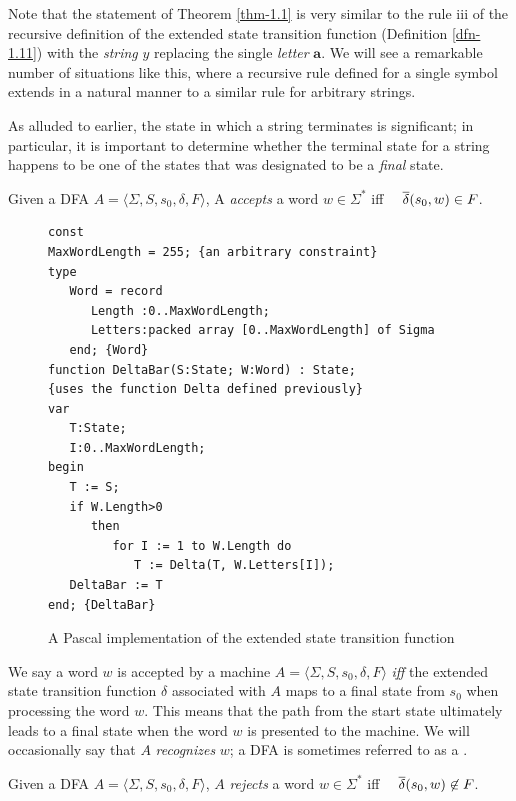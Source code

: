 Note that the statement of Theorem \ref{thm-1.1} is very similar to the rule iii
of the recursive definition of the extended state transition function
(Definition \ref{dfn-1.11}) with the \emph{string} $y$ replacing the single
\emph{letter} $\pmb{a}$. We will see a remarkable number of situations like this,
where a recursive rule defined for a single symbol extends in a natural manner
to a similar rule for arbitrary strings.

As alluded to earlier, the state in which a string terminates is significant; in
particular, it is important to determine whether the terminal state for a string
happens to be one of the states that was designated to be a \emph{final} state.

\begin{dfn}\label{dfn-1.12}
Given a DFA $A = \langle\Sigma,S,s_0,\delta,F\rangle$, A \emph{accepts} a word
$w \in \Sigma^*$ iff \ \  $\overline{\delta}(s_0,w) \in F$.
\end{dfn}

\begin{figure}
\begin{verbatim}
const
MaxWordLength = 255; {an arbitrary constraint} 
type 
   Word = record 
      Length :0..MaxWordLength; 
      Letters:packed array [0..MaxWordLength] of Sigma 
   end; {Word} 
function DeltaBar(S:State; W:Word) : State; 
{uses the function Delta defined previously} 
var 
   T:State; 
   I:0..MaxWordLength; 
begin 
   T := S; 
   if W.Length>0 
      then 
         for I := 1 to W.Length do 
            T := Delta(T, W.Letters[I]); 
   DeltaBar := T
end; {DeltaBar}
\end{verbatim}
\caption{A Pascal implementation of the extended state transition function}\label{fig-1.5}
\end{figure}

We say a word $w$ is accepted by a machine $A = \langle\Sigma,S,s_0,\delta,F
\rangle$ \emph{iff} the extended state transition function $\delta$ associated
with $A$ maps to a final state from $s_0$ when processing the word $w$. This
means that the path from the start state ultimately leads to a final state when
the word $w$ is presented to the machine. We will occasionally say that $A$
\emph{recognizes} $w$; a DFA is sometimes referred to as a
\emph{}.

\begin{dfn}\label{dfn-1.13}
Given a DFA $A = \langle\Sigma,S,s_0,\delta,F\rangle$, $A$ \emph{rejects} a word $w \in
\Sigma^*$ iff \ \  $\overline{\delta}(s_0,w) \not \in F$.
\end{dfn}

